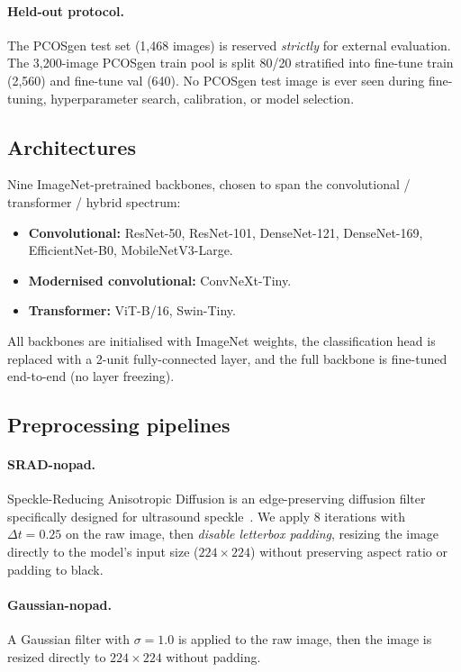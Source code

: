 \documentclass[11pt,twocolumn]{article}
\newcommand{\PCOS}{PCOS}
\newcommand{\SRAD}{SRAD}
\begin{document}
\paragraph{Held-out protocol.}
The \PCOS{}gen test set (1,468 images) is reserved \emph{strictly} for
external evaluation. The 3,200-image \PCOS{}gen train pool is split
80/20 stratified into fine-tune train (2,560) and fine-tune val (640). No
\PCOS{}gen test image is ever seen during fine-tuning, hyperparameter
search, calibration, or model selection.

\subsection{Architectures}
Nine ImageNet-pretrained backbones, chosen to span the convolutional /
transformer / hybrid spectrum:

\begin{itemize}[leftmargin=*,noitemsep,topsep=2pt]
  \item \textbf{Convolutional:} ResNet-50, ResNet-101, DenseNet-121,
        DenseNet-169, EfficientNet-B0, MobileNetV3-Large.
  \item \textbf{Modernised convolutional:} ConvNeXt-Tiny.
  \item \textbf{Transformer:} ViT-B/16, Swin-Tiny.
\end{itemize}

All backbones are initialised with ImageNet weights, the classification
head is replaced with a 2-unit fully-connected layer, and the full
backbone is fine-tuned end-to-end (no layer freezing).

\subsection{Preprocessing pipelines}

\paragraph{\SRAD{}-nopad.}
Speckle-Reducing Anisotropic Diffusion is an edge-preserving diffusion
filter specifically designed for ultrasound speckle~\cite{yu2002}. We
apply 8 iterations with $\Delta t = 0.25$ on the raw image, then
\emph{disable letterbox padding}, resizing the image directly to the
model's input size ($224 \times 224$) without preserving aspect ratio or
padding to black.

\paragraph{Gaussian-nopad.}
A Gaussian filter with $\sigma = 1.0$ is applied to the raw image, then
the image is resized directly to $224 \times 224$ without padding.
\end{document}

